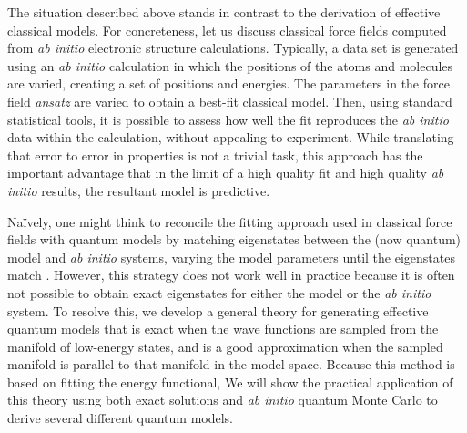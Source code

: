 The situation described above stands in contrast to the derivation of effective classical models. 
For concreteness, let us discuss classical force fields computed from {\it ab initio} electronic structure calculations. 
Typically, a data set is generated using an {\it ab initio} calculation in which the positions of the atoms and molecules are varied, creating a set of positions and energies. 
The parameters in the force field {\it ansatz} are varied to obtain a best-fit classical model.
Then, using standard statistical tools, it is possible to assess how well the fit reproduces the {\it ab initio} data within the calculation, without appealing to experiment. 
While translating that error to error in properties is not a trivial task, this approach has the important advantage that in the limit of a high quality fit and high quality {\it ab initio} results, the resultant model is predictive.

Na\"ively, one might think to reconcile the fitting approach used in classical force fields with quantum models by matching eigenstates between the (now quantum) model and {\it ab initio} systems, varying the model parameters until the eigenstates match \cite{Wagner2013}. 
However, this strategy does not work well in practice because it is often not possible to obtain exact eigenstates for either the model or the {\it ab initio} system.
To resolve this, we develop a general theory for generating effective quantum models that is exact when the wave functions are sampled from the manifold of low-energy states, and is a good approximation when the sampled manifold is parallel to that manifold in the model space. 
Because this method is based on fitting the energy functional, 
We will show the practical application of this theory using both exact solutions and {\it ab initio} quantum Monte Carlo to derive several different quantum models.



